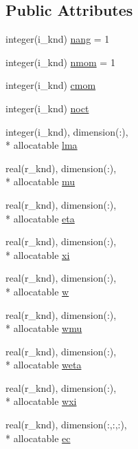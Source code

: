 \subsection*{Public Attributes}
\begin{DoxyCompactItemize}
\item 
integer(i\-\_\-knd) \hyperlink{classsn__module_acb1f3dc6837597cfce3b070824a30549}{nang} = 1
\item 
integer(i\-\_\-knd) \hyperlink{classsn__module_ad3d327af15ae17449d60cbeddafa7b32}{nmom} = 1
\item 
integer(i\-\_\-knd) \hyperlink{classsn__module_a08c4b51b7f03f5fd936beded46295001}{cmom}
\item 
integer(i\-\_\-knd) \hyperlink{classsn__module_a981cf289719fc9d8b6be965decbf841a}{noct}
\item 
integer(i\-\_\-knd), dimension(\-:), \\*
allocatable \hyperlink{classsn__module_a4ea10df8637124ad5ba5fedcad899761}{lma}
\item 
real(r\-\_\-knd), dimension(\-:), \\*
allocatable \hyperlink{classsn__module_ac93ecb91c234e5c544ad83bfda53f57b}{mu}
\item 
real(r\-\_\-knd), dimension(\-:), \\*
allocatable \hyperlink{classsn__module_a56d70ad9f47dfacf81cec43705659ad5}{eta}
\item 
real(r\-\_\-knd), dimension(\-:), \\*
allocatable \hyperlink{classsn__module_ab5621b664bb7f8eb4a3344d4158791a8}{xi}
\item 
real(r\-\_\-knd), dimension(\-:), \\*
allocatable \hyperlink{classsn__module_a109cb91fae331094d4e39d49580b30d3}{w}
\item 
real(r\-\_\-knd), dimension(\-:), \\*
allocatable \hyperlink{classsn__module_a184aa5bf38e29bc2afe65a69d4d26551}{wmu}
\item 
real(r\-\_\-knd), dimension(\-:), \\*
allocatable \hyperlink{classsn__module_ae34946f144f7ac3c298cc15fb0ba7f1d}{weta}
\item 
real(r\-\_\-knd), dimension(\-:), \\*
allocatable \hyperlink{classsn__module_aa6da1bff94a27edddbf1b18657999c43}{wxi}
\item 
real(r\-\_\-knd), dimension(\-:,\-:,\-:), \\*
allocatable \hyperlink{classsn__module_a6c731da2dcf64d3f53314281c79e26a0}{ec}
\end{DoxyCompactItemize}


